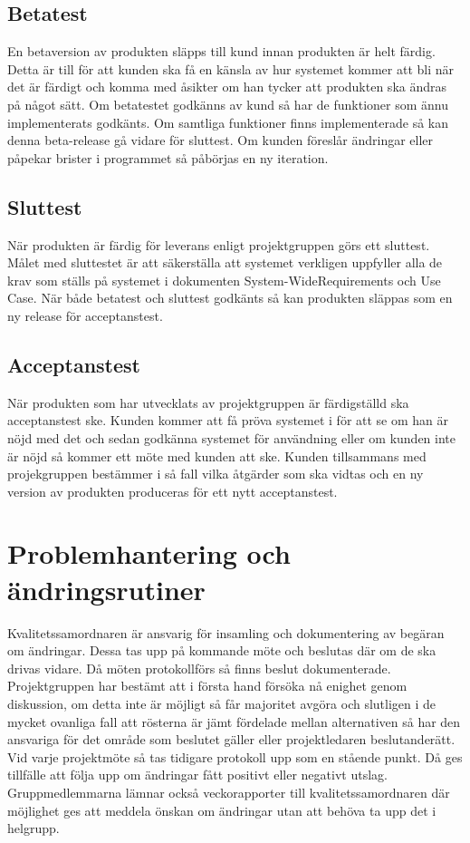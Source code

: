 \subsection{Betatest}
En betaversion av produkten släpps till kund innan produkten är helt färdig. Detta är till för att kunden ska få en känsla av hur systemet kommer att bli när det är färdigt och komma med åsikter om han tycker att produkten ska ändras på något sätt. Om betatestet godkänns av kund så har de funktioner som ännu implementerats godkänts. Om samtliga funktioner finns implementerade så kan denna beta-release gå vidare för sluttest. Om kunden föreslår ändringar eller påpekar brister i programmet så påbörjas en ny iteration.

\subsection{Sluttest}
När produkten är färdig för leverans enligt projektgruppen görs ett sluttest. Målet med sluttestet är att säkerställa att systemet verkligen uppfyller alla de krav som ställs på systemet i dokumenten System-WideRequirements och Use Case. När både betatest och sluttest godkänts så kan produkten släppas som en ny release för acceptanstest.

\subsection{Acceptanstest}
När produkten som har utvecklats av projektgruppen är färdigställd ska acceptanstest ske. Kunden kommer att få pröva systemet i för att se om han är nöjd med det och sedan godkänna systemet för användning eller om kunden inte är nöjd så kommer ett möte med kunden att ske. Kunden tillsammans med projekgruppen bestämmer i så fall vilka åtgärder som ska vidtas och en ny version av produkten produceras för ett nytt acceptanstest.

\section{Problemhantering och ändringsrutiner}
Kvalitetssamordnaren är ansvarig för insamling och dokumentering av begäran om ändringar. Dessa tas upp på kommande möte och beslutas där om de ska drivas vidare. Då möten protokollförs så finns beslut dokumenterade. Projektgruppen har bestämt att i första hand försöka nå enighet genom diskussion, om detta inte är möjligt så får majoritet avgöra och slutligen i de mycket ovanliga fall att rösterna är jämt fördelade mellan alternativen så har den ansvariga för det område som beslutet gäller eller projektledaren beslutanderätt. Vid varje projektmöte så tas tidigare protokoll upp som en stående punkt. Då ges tillfälle att följa upp om ändringar fått positivt eller negativt utslag. Gruppmedlemmarna lämnar också veckorapporter till kvalitetssamordnaren där möjlighet ges att meddela önskan om ändringar utan att behöva ta upp det i helgrupp.

